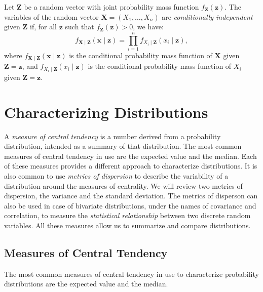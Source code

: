 \begin{definition}
Let \( \mathbf{Z} \) be a random vector with joint probability mass function \( f_{\mathbf{Z}}(\mathbf{z}) \). The variables of the random vector \( \mathbf{X} = (X_{1}, \ldots, X_{n}) \) are \emph{conditionally independent} given \( \mathbf{Z} \) if, for all \( \mathbf{z} \) such that \( f_{\mathbf{Z}}(\mathbf{z}) > 0 \), we have:
\[
f_{\mathbf{X} \mid \mathbf{Z}} (\mathbf{x} \mid \mathbf{z}) = \prod_{i=1}^{n} f_{X_i \mid \mathbf{Z}}(x_{i} \mid \mathbf{z}),
\]
where \( f_{\mathbf{X} \mid \mathbf{Z}}(\mathbf{x} \mid \mathbf{z}) \) is the conditional probability mass function of \( \mathbf{X} \) given \( \mathbf{Z} = \mathbf{z} \), and \( f_{X_i \mid \mathbf{Z}}(x_{i} \mid \mathbf{z}) \) is the conditional probability mass function of \( X_{i} \) given \( \mathbf{Z} = \mathbf{z} \).
\end{definition}

%
%

\section{Characterizing Distributions}
\label{sec:probability_expectation}

A \emph{measure of central tendency} is a number derived from a probability distribution, intended as a summary of that distribution. The most common measures of central tendency in use are the expected value and the median. Each of these measures provides a different approach to characterize distributions. It is also common to use \emph{metrics of dispersion} to describe the variability of a distribution around the measures of centrality. We will review two metrics of dispersion, the variance and the standard deviation. The metrics of disperson can also be used in case of bivariate distributions, under the names of covariance and correlation, to measure the \emph{statistical relationship} between two discrete random variables. All these measures allow us to summarize and compare distributions.

%
%

\subsection{Measures of Central Tendency}

The most common measures of central tendency in use to characterize probability distributions are the expected value and the median.

